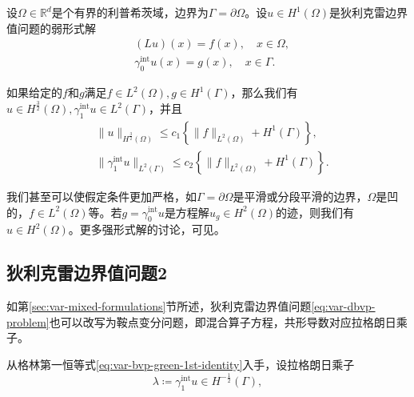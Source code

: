 \begin{theorem}
  设$\Omega \in \mathbb{R}^d$是个有界的利普希茨域，边界为$\Gamma = \partial \Omega$。设$u \in H^{1}(\Omega)$是狄利克雷边界值问题的弱形式解
  \begin{equation*}
    \begin{split}
      &(L u)(x) = f(x), \quad x \in \Omega,\\
      &\gamma_{0}^{\text{int}} u(x) = g(x), \quad x \in \Gamma.
    \end{split}
  \end{equation*}

  如果给定的$f$和$g$满足$f \in L^{2}(\Omega), g \in H^{1}(\Gamma)$，那么我们有$u \in H^{\frac{3}{2}}(\Omega), \gamma_{1}^{\text{int}} u \in L^{2}(\Gamma)$，并且
  \begin{equation*}
  \begin{split}
  &\big\| u \big\|_{H^{\frac{3}{2}}(\Omega)} \le c_1
  \left\{
  \big\| f \big\|_{L^{2}(\Omega)} + H^{1}(\Gamma)
  \right\},\\
  & \big\| \gamma_{1}^{\text{int}} u \big\|_{L^{2}(\Gamma)} \le c_2 \left\{
  \big\| f \big\|_{L^{2}(\Omega)} + H^{1}(\Gamma)
  \right\}.
  \end{split}
  \end{equation*}
\end{theorem}

我们甚至可以使假定条件更加严格，如$\Gamma = \partial \Omega$是平滑或分段平滑的边界，$\Omega$是凹的，$f \in L^{2}(\Omega)$等。若$g = \gamma_{0}^{\text{int}} u $是方程解$u_g \in H^2(\Omega)$的迹，则我们有$u \in H^2(\Omega)$。更多强形式解的讨论，可见\cite{Demkowicz:2006ww,Demkowicz:2007ur}。

\subsection{狄利克雷边界值问题2}
\label{sec:var-bvp-dirichlet-lagrange}

如第\ref{sec:var-mixed-formulations}节所述，狄利克雷边界值问题\eqref{eq:var-dbvp-problem}也可以改写为鞍点变分问题，即混合算子方程，共形导数对应拉格朗日乘子\citep{Babuska:1973gu, Bramble:1981vv}。

从格林第一恒等式\eqref{eq:var-bvp-green-1st-identity}入手，设拉格朗日乘子
\begin{equation*}
  \lambda \coloneqq \gamma_1^{\text{int}} u \in H^{-\frac{1}{2}}(\Gamma),
\end{equation*}

